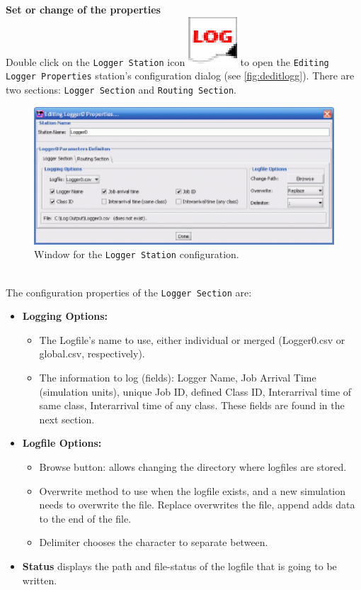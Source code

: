 \noindent \textbf{Set or change of the properties}\\
Double click on the \texttt{Logger Station} icon
\includegraphics[scale=.5]{img/jsimg/logger}
to open the \texttt{Editing Logger Properties} station's
configuration dialog (see \autoref{fig:deditlogg}). There are two
sections:
\texttt{Logger Section} and \texttt{Routing Section}.\\
\begin{figure}[htb]
    \begin{center}
        \includegraphics[scale=.8]{img/jsimg/logger_editFull_sm.eps}
    \end{center}
    \caption{Window for the \texttt{Logger Station} configuration.}
    \label{fig:deditlogg}
\end{figure}

\\
The configuration properties of the \texttt{Logger Section} are:
\begin{itemize} \item \textbf{Logging Options:}
\begin{itemize} \item   The Logfile's name to use, either individual or merged
(Logger0.csv or global.csv, respectively). \item The information
to log (fields): Logger Name, Job Arrival Time (simulation units),
unique Job ID, defined Class ID, Interarrival time of same class,
Interarrival time of any class. These fields are found in the next
section. \end{itemize} \item \textbf{Logfile Options:}
\begin{itemize} \item Browse button: allows changing the directory where
logfiles are stored. \item Overwrite method to use when the
logfile exists, and a new simulation needs to overwrite the file.
Replace overwrites the file, append adds data to the end of the
file. \item Delimiter chooses the character to separate between.
\end{itemize}
\item \textbf{Status} displays the path and file-status of the
logfile that is going to be written.
\end{itemize}

